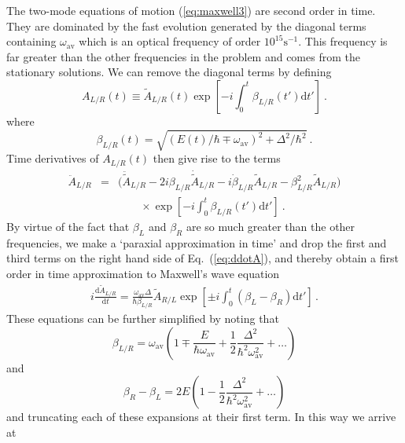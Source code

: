 \documentclass[twocolumn,english,pra,aps,superscriptaddress,floatfix]{revtex4-1}
\begin{document}
The two-mode equations of motion (\ref{eq:maxwell3}) are second order in time. They are dominated by the fast evolution generated by the diagonal terms containing $\omega_{\mathrm{av}}$ which is an optical frequency of order $10^{15}\mathrm{s}^{-1}$. This frequency is far greater than the other frequencies in the problem and comes from the stationary solutions. We can remove the diagonal terms by defining 
\begin{equation}
A_{L/R}(t) \equiv \widetilde{A}_{L/R}(t)  \exp \left[-i  \int_{0}^{t} \beta_{L/R}(t') \mathrm{d} t' \right] \ . 
\label{eq:Atilde}
\end{equation}
where
\begin{equation}
\beta_{L/R}(t)=\sqrt{(E(t)/\hbar \mp \omega_{\mathrm{av}})^2+\Delta^{2}/\hbar^{2}} \ .
\end{equation}
Time derivatives of $A_{L/R}(t)$ then give rise to the terms 
\begin{eqnarray}
\ddot{A}_{L/R} & = &\big(\ddot{\tilde{A}}_{L/R}-2 i \beta_{L/R} \dot{\tilde{A}}_{L/R}- i \dot{\beta}_{L/R}\tilde{A}_{L/R}-\beta_{L/R}^{2}\tilde{A}_{L/R} \big) \nonumber \\
&& \quad \quad \times  \exp \left[-i  \int_{0}^{t} \beta_{L/R}(t') \mathrm{d} t' \right] \ .
\label{eq:ddotA}
\end{eqnarray}
By virtue of the fact that $\beta_{L}$ and $\beta_{R}$ are so much greater than the other frequencies,  we make a `paraxial approximation in time' and drop the first and third terms on the right hand side of Eq.\ (\ref{eq:ddotA}), and thereby obtain a first order in time approximation to Maxwell's wave equation
\begin{eqnarray}
i\frac{\mathrm{d} \tilde{A}_{L/R}}{\mathrm{d}t}=\frac{ \omega_{\mathrm{av}}\Delta }{\hbar \beta_{L/R}}\tilde{A}_{R/L} \exp \left[ \pm i\int_{0}^{t}(\beta_{L}-\beta_{R}) \mathrm{d}t'\right] \, . 
\end{eqnarray}
These equations can be further simplified by noting that
\begin{equation}
\beta_{L/R} = \omega_{\mathrm{av}}\left(1\mp \frac{E}{\hbar \omega_{\mathrm{av}}}+\frac{1}{2}\frac{\Delta^2}{\hbar^2 \omega_{\mathrm{av}}^2} +\ldots \right) 
\label{eq:betaexpansion}
\end{equation}
and
\begin{equation}
\beta_{R}-\beta_{L}=2E(1-\frac{1}{2}\frac{\Delta^{2}}{\hbar^2 \omega_{\mathrm{av}}^2}+\ldots)
\label{eq:betadifferenceexpansion}
\end{equation}
and truncating each of these expansions at their first term. In this way we arrive at
\end{document}

